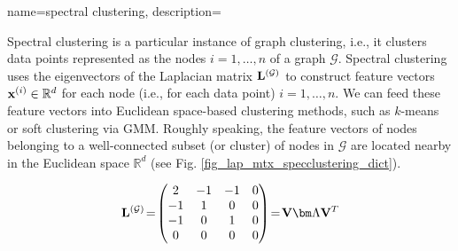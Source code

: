 {name={spectral clustering},
	description={Spectral clustering is a particular instance of 
		graph clustering, i.e., it clusters data points 
		represented as the nodes $i=1,\ldots,n$ of a graph $\mathcal{G}$. 
		Spectral clustering uses the eigenvectors of the Laplacian matrix ${\bf L}^{(\mathcal{G})}$ 
		to construct feature vectors ${\bf x}^{(i)} \in \mathbb{R}^{d}$ 
		for each node (i.e., for each data point) $i=1,\ldots,n$. We can feed these feature vectors 
		into Euclidean space-based clustering methods, such as $k$-means 
		or soft clustering via GMM. Roughly speaking, the feature vectors of nodes 
		belonging to a well-connected subset (or cluster) of nodes in $\mathcal{G}$ are located 
		nearby in the Euclidean space $\mathbb{R}^{d}$ (see Fig. \ref{fig_lap_mtx_specclustering_dict}). 
		\begin{figure}[H]
			\begin{center}
				\begin{minipage}{0.4\textwidth}
				\end{minipage} 
				\hspace*{5mm}
				\begin{minipage}{0.4\textwidth}
					\begin{equation} 
						{\bf L}^{(\mathcal{G})}\!=\!
						\begin{pmatrix} 
							2 & -1 & -1 & 0 \\ 
							-1 & 1 & 0 & 0 \\  
							-1 & 0 & 1 & 0 \\ 
							0 & 0 & 0 & 0 
						\end{pmatrix}\!=\!\mathbf{V} {\bm \Lambda} \mathbf{V}^{T}  
						\nonumber
					\end{equation} 

\end{minipage}
\end{center}
\end{figure}}}
